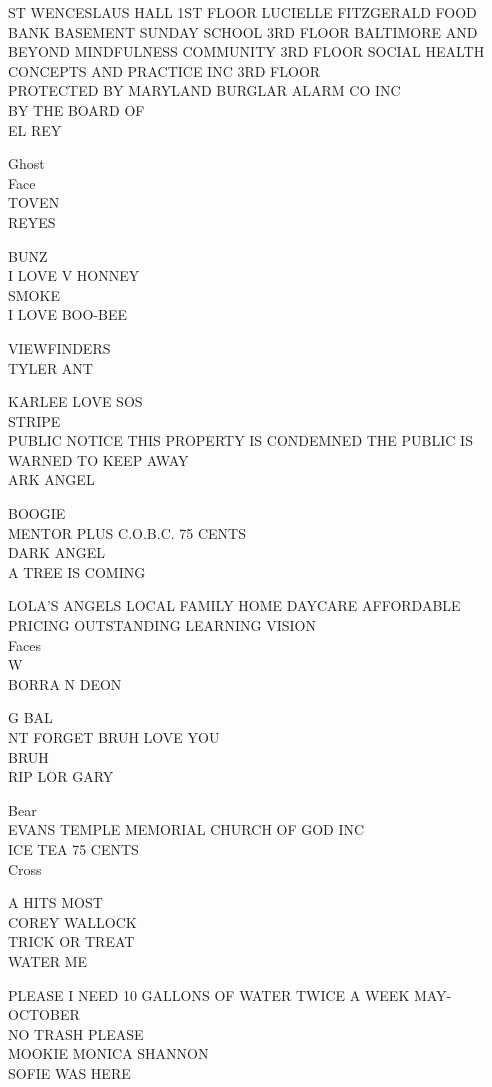 \documentclass[10pt,letterpaper]{article}
\begin{document}
ST WENCESLAUS HALL 1ST FLOOR LUCIELLE FITZGERALD FOOD BANK BASEMENT SUNDAY SCHOOL 3RD FLOOR BALTIMORE AND BEYOND MINDFULNESS COMMUNITY 3RD FLOOR SOCIAL HEALTH CONCEPTS AND PRACTICE INC 3RD FLOOR\\
PROTECTED BY MARYLAND BURGLAR ALARM CO INC\\
BY THE BOARD OF\\
EL REY

Ghost\\
Face\\
TOVEN\\
REYES

BUNZ\\
I LOVE V HONNEY\\
SMOKE\\
I LOVE BOO{-}BEE

VIEWFINDERS\\
TYLER ANT

KARLEE LOVE SOS\\
STRIPE\\
PUBLIC NOTICE THIS PROPERTY IS CONDEMNED THE PUBLIC IS WARNED TO KEEP AWAY\\
ARK ANGEL

BOOGIE\\
MENTOR PLUS C.O.B.C. 75 CENTS\\
DARK ANGEL\\
A TREE IS COMING

LOLA'S ANGELS LOCAL FAMILY HOME DAYCARE AFFORDABLE PRICING OUTSTANDING LEARNING VISION\\
Faces\\
W\\
BORRA N DEON

G BAL\\
NT FORGET BRUH LOVE YOU\\
BRUH\\
RIP LOR GARY

Bear\\
EVANS TEMPLE MEMORIAL CHURCH OF GOD INC\\
ICE TEA 75 CENTS\\
Cross

A HITS MOST\\
COREY WALLOCK\\
TRICK OR TREAT\\
WATER ME

PLEASE I NEED 10 GALLONS OF WATER TWICE A WEEK MAY{-}OCTOBER\\
NO TRASH PLEASE\\
MOOKIE MONICA SHANNON\\
SOFIE WAS HERE
\end{document}
